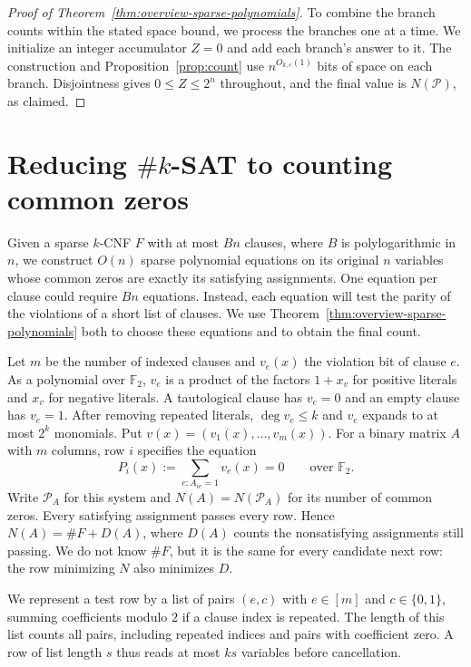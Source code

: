 \documentclass[11pt,reqno]{amsart}
\numberwithin{equation}{section}
\theoremstyle{definition}\newtheorem{definition}[theorem]{Definition}
\theoremstyle{remark}\newtheorem{remark}[theorem]{Remark}
\renewcommand{\le}{\leqslant}
\begin{document}
\begin{proof}[Proof of Theorem~\ref{thm:overview-sparse-polynomials}]
To combine the branch counts within the stated space bound, we
process the branches one at a time. We initialize an integer
accumulator $Z=0$ and add each branch's answer to it. The construction and
Proposition~\ref{prop:count} use $n^{O_{k,c}(1)}$ bits of space on
each branch.
Disjointness gives $0\le Z\le2^n$ throughout, and the final value
is $N(\mathcal P)$, as claimed.
\end{proof}

\section{Reducing \texorpdfstring{$\#k$-SAT}{\#k-SAT} to counting common zeros}\label{sec:hashes}\label{subsec:sparse-hashes}
Given a sparse $k$-CNF $F$ with at most $Bn$ clauses, where $B$ is
polylogarithmic in $n$, we construct $O(n)$ sparse polynomial
equations on its original $n$ variables whose common zeros are exactly
its satisfying assignments. One equation per clause could require
$Bn$ equations. Instead, each equation will test the parity of the
violations of a short list of clauses. We use
Theorem~\ref{thm:overview-sparse-polynomials} both to choose these
equations and to obtain the final count.

Let $m$ be the number of indexed clauses and $v_e(x)$ the violation bit
of clause $e$. As a polynomial over $\mathbb F_2$, $v_e$ is a product
of the factors $1+x_v$ for positive literals and $x_v$ for negative
literals. A tautological clause has $v_e=0$ and an empty clause has
$v_e=1$. After removing repeated literals, $\deg v_e\le k$ and $v_e$
expands to at most $2^k$ monomials. Put $v(x)=(v_1(x),\ldots,v_m(x))$.
For a binary matrix $A$ with $m$ columns, row $i$ specifies the equation
\begin{equation}\label{eq:hash-query}
 P_i(x):=\sum_{e:A_{ie}=1} v_e(x)=0\qquad\text{over }\mathbb F_2.
\end{equation}
Write $\mathcal P_A$ for this system and $N(A)=N(\mathcal P_A)$ for its
number of common zeros. Every satisfying assignment passes every row.
Hence $N(A)=\#F+D(A)$, where $D(A)$ counts the nonsatisfying assignments
still passing. We do not know $\#F$, but it is the same for every
candidate next row: the row minimizing $N$ also minimizes $D$.

We represent a test row by a list of pairs $(e,c)$ with
$e\in[m]$ and $c\in\{0,1\}$, summing coefficients modulo $2$ if a
clause index is repeated. The length of this list counts all pairs,
including repeated indices and pairs with coefficient zero. A row of
list length $s$ thus reads at most $ks$ variables before cancellation.
\end{document}
